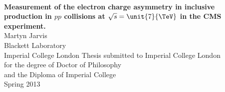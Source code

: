 \begin{titlepage}
\begin{center}
\vspace{5cm}
~
\\[2cm]
\Large{\textbf{Measurement of the electron charge asymmetry in inclusive \PW
production in $pp$ collisions at $\sqrt{s} = \unit{7}{\TeV}$ in the CMS
experiment.}}
\\[2cm]
\large{Martyn Jarvis}
\\[1cm]
\large{Blackett Laboratory\\Imperial College London}
\vfill
\normalsize{Thesis submitted to Imperial College London\\
       for the degree of Doctor of Philosophy\\
       and the Diploma of Imperial College}
\\[1cm]
\normalsize{Spring 2013}

\end{center}
\end{titlepage}

\cleardoublepage


